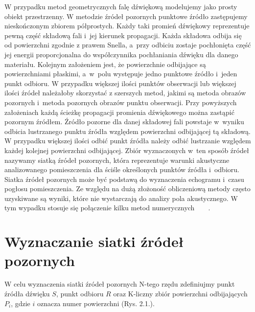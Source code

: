 W przypadku metod geometrycznych falę dźwiękową modelujemy jako prosty obiekt przestrzenny. W metodzie źródeł pozornych punktowe źródło zastępujemy nieskończonym zbiorem półprostych. Każdy taki promień dźwiękowy reprezentuje pewną część składową fali i~jej kierunek propagacji. Każda składowa odbija się od powierzchni zgodnie z prawem Snella, a~przy odbiciu zostaje pochłonięta część jej energii proporcjonalna do współczynnika pochłaniania dźwięku dla danego materiału. Kolejnym założeniem jest, że powierzchnie odbijające są powierzchniami płaskimi, a~w~polu występuje jedno  punktowe źródło i~jeden punkt odbioru. W przypadku większej ilości punktów obserwacji lub większej ilości źródeł należałoby skorzystać z szerszych metod, jakimi są metoda obrazów pozornych i~metoda pozornych obrazów punktu obserwacji. Przy powyższych założeniach  każdą ścieżkę propagacji promienia dźwiękowego można zastąpić pozornym źródłem. Źródło pozorne dla danej składowej fali powstaje w~wyniku odbicia lustrzanego punktu źródła względem powierzchni odbijającej tą składową. W przypadku większej ilości odbić punkt źródła należy odbić lustrzanie względem każdej kolejnej powierzchni odbijającej. Zbiór wyznaczonych w~ten sposób źródeł nazywamy siatką źródeł pozornych, która reprezentuje warunki akustyczne analizowanego pomieszczenia dla ściśle określonych punktów źródła i~odbioru. Siatka źródeł pozornych może być podstawą do wyznaczenia echogramu i~czasu pogłosu pomieszczenia. Ze względu na dużą złożoność obliczeniową metody często uzyskiwane są wyniki, które nie wystarczają do analizy pola akustycznego. W tym wypadku stosuje się połączenie kilku metod numerycznych~\cite{b11}~\cite{b12}~\cite{b13}~\cite{b14}.


\section{Wyznaczanie siatki źródeł pozornych}\label{sec:szp}

W celu wyznaczenia siatki źródeł pozornych N-tego rzędu zdefiniujmy punkt źródła dźwięku $S$, punkt odbioru $R$ oraz K-liczny zbiór powierzchni odbijających $P_i$, gdzie $i$ oznacza numer powierzchni (Rys. 2.1.). 

